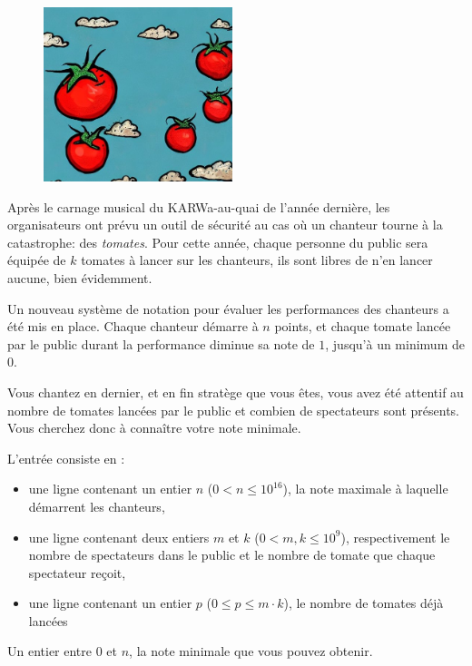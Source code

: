 \problemname{\problemyamlname}

\begin{figure}
    \centering
    \includegraphics[width=5.5cm]{tomates.jpeg}
\end{figure}

Après le carnage musical du KARWa-au-quai de l'année dernière, les organisateurs ont prévu un outil de sécurité au cas où un chanteur tourne à la catastrophe: des \emph{tomates}. Pour cette année, chaque personne du public sera équipée de $k$ tomates à lancer sur les chanteurs, ils sont libres de n'en lancer aucune, bien évidemment.

Un nouveau système de notation pour évaluer les performances des chanteurs a été mis en place. Chaque chanteur démarre à $n$ points, et chaque tomate lancée par le public durant la performance diminue sa note de $1$, jusqu'à un minimum de $0$.

Vous chantez en dernier, et en fin stratège que vous êtes, vous avez été attentif au nombre de tomates lancées par le public et combien de spectateurs sont présents. Vous cherchez donc à connaître votre note minimale.

\begin{Input}
	L'entrée consiste en :
	\begin{itemize}
		\item une ligne contenant un entier $n$ ($0 < n \le 10^{16}$), la note maximale à laquelle démarrent les chanteurs,
		\item une ligne contenant deux entiers $m$ et $k$ ($0 < m,k \le 10^9$), respectivement le nombre de spectateurs dans le public et le nombre de tomate que chaque spectateur reçoit,
		\item une ligne contenant un entier $p$ ($0 \le p \le m \cdot k$), le nombre de tomates déjà lancées
	\end{itemize}
\end{Input}

\begin{Output}
	Un entier entre $0$ et $n$, la note minimale que vous pouvez obtenir.
\end{Output}
